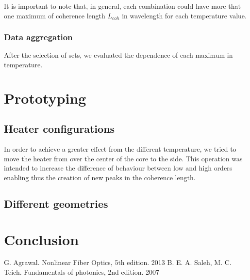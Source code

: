 \documentclass[12pt,a4paper,twoside]{article}
\begin{document}
It is important to note that, in general, each combination could have more that one maximum of coherence length $L_{coh}$ in wavelength for each temperature value.

\subsubsection*{Data aggregation}
After the selection of sets, we evaluated the dependence of each maximum in temperature.
\section{Prototyping}

\subsection{Heater configurations}
In order to achieve a greater effect from the different temperature, we tried to move the heater from over the center of the core to the side.
This operation was intended to increase the difference of behaviour between low and high orders enabling thus the creation of new peaks in the coherence length.
\subsection{Different geometries}

\section{Conclusion}

\cleardoublepage
\begin{thebibliography}{9}
 G. Agrawal. Nonlinear Fiber Optics, 5th edition. 2013
 B. E. A. Saleh, M. C. Teich. Fundamentals of photonics, 2nd edition. 2007
\end{thebibliography}
\end{document}
